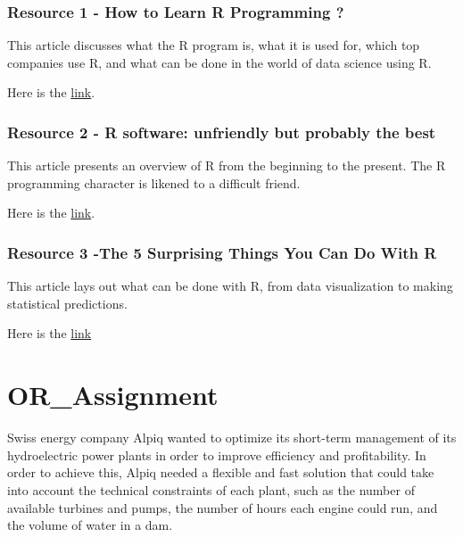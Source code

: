 \documentclass[
  letterpaper,
  DIV=11,
  numbers=noendperiod]{scrreprt}
\begin{document}
\hypertarget{resource-1---how-to-learn-r-programming}{%
\subsection{Resource 1 - How to Learn R Programming
?}\label{resource-1---how-to-learn-r-programming}}

This article discusses what the R program is, what it is used for, which
top companies use R, and what can be done in the world of data science
using R.

Here is the
\href{https://www.simplilearn.com/how-to-learn-r-programming-article}{link}.

\hypertarget{resource-2---r-software-unfriendly-but-probably-the-best}{%
\subsection{Resource 2 - R software: unfriendly but probably the
best}\label{resource-2---r-software-unfriendly-but-probably-the-best}}

This article presents an overview of R from the beginning to the
present. The R programming character is likened to a difficult friend.

Here is the
\href{https://www.ncbi.nlm.nih.gov/pmc/articles/PMC7063554/}{link}.

\hypertarget{resource-3--the-5-surprising-things-you-can-do-with-r}{%
\subsection{Resource 3 -The 5 Surprising Things You Can Do With
R}\label{resource-3--the-5-surprising-things-you-can-do-with-r}}

This article lays out what can be done with R, from data visualization
to making statistical predictions.

Here is the
\href{https://www.kdnuggets.com/2022/08/5-surprising-things-r.html}{link}


\hypertarget{or_assignment}{%
\chapter{\texorpdfstring{\textbf{OR\_Assignment}}{OR\_Assignment}}\label{or_assignment}}

Swiss energy company Alpiq wanted to optimize its short-term management
of its hydroelectric power plants in order to improve efficiency and
profitability. In order to achieve this, Alpiq needed a flexible and
fast solution that could take into account the technical constraints of
each plant, such as the number of available turbines and pumps, the
number of hours each engine could run, and the volume of water in a dam.
\end{document}
